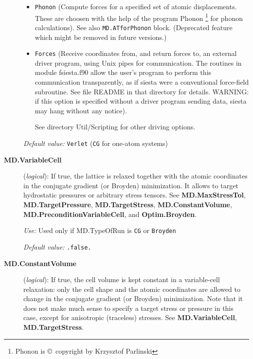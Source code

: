 \documentclass[11pt]{article}
\begin{document}
\begin{description}
\begin{itemize}
\item {\tt Phonon} (Compute forces for a specified set of atomic
displacements. These are choosen with the help of the program {\sc
Phonon} \footnote{{\sc Phonon} is \copyright\ copyright by Krzysztof
Parlinski}    for phonon calculations). See
also {\tt MD.ATforPhonon} block. (Deprecated feature which might be
removed in future versions.)

\item {\tt Forces} (Receive coordinates from, and return forces to,
an external driver program, using Unix pipes for communication.
The routines in module fsiesta.f90 allow the
user's program to perform this communication transparently, as if
siesta were a conventional force-field subroutine. See file README
in that directory for details. WARNING: if this option is specified
without a driver program sending data, siesta may hang without
any notice).

See directory Util/Scripting  for other driving options.

\end{itemize}
    
{\it Default value:} {\tt Verlet} ({\tt CG} for one-atom systems)


\item[{\bf MD.VariableCell}] ({\it logical}):
 
If true, the lattice is relaxed together with the atomic coordinates
in the conjugate gradient (or Broyden) minimization. It allows to target
hydrostatic pressures or arbitrary stress tensors.  See {\bf
MD.MaxStressTol}, {\bf MD.TargetPressure}, {\bf MD.TargetStress}, {\bf
  MD.ConstantVolume}, {\bf MD.PreconditionVariableCell}, and {\bf Optim.Broyden}.

{\it Use:} Used only if MD.TypeOfRun is {\tt CG} or {\tt Broyden}

{\it Default value:} {\tt .false.}

\item[{\bf MD.ConstantVolume}] ({\it logical}):
If true, the cell volume is kept constant in a variable-cell
relaxation: only the cell shape and the atomic coordinates are allowed
to change in the conjugate gradient (or Broyden) minimization. 
Note that it does not make much sense to specify a target stress or
pressure in this case, except for anisotropic (traceless) stresses.
See {\bf MD.VariableCell}, {\bf MD.TargetStress}.


\end{description}
\end{document}
